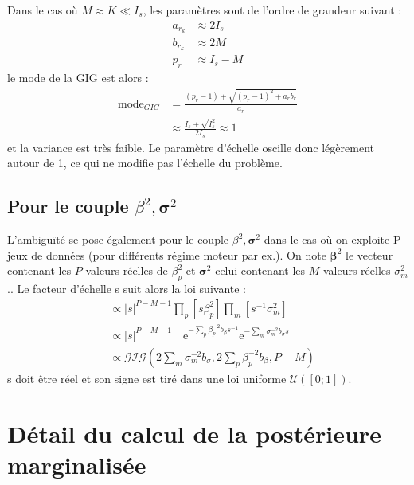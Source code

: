 \documentclass[ 12pt]{article}
\renewcommand\thesection{\Roman{section}} %
\newcommand{\e}{\mathrm{e}}
\begin{document}
Dans le cas où $M\approx K \ll I_s$, les paramètres sont de l'ordre de grandeur suivant :
\begin{align*}
	a_{r_k} &\approx 2 I_s\\
	b_{r_k} &\approx 2M\\
	p_r &\approx  I_s-M
\end{align*}
le mode de la GIG est alors :
\begin{align*}
	\mathrm{mode}_{GIG} & = \frac{(p_r -1) + \sqrt{(p_r-1)^2 + a_rb_r}}{a_r}\\
	& \approx \frac{I_s + \sqrt{I_s^2}}{2I_s} \approx 1
\end{align*}
et la variance est très faible.
Le paramètre d'échelle oscille donc légèrement autour de 1, ce qui ne modifie pas l'échelle du problème.\\


\subsection[]{Pour le couple $\beta^2, \bm{\sigma}^2$}
L’ambiguïté se pose également pour le couple $\beta^2, \bm{\sigma}^2$ dans le cas où on exploite P jeux de données (pour différents régime moteur par ex.).
On note $\bm{\beta}^2$ le vecteur contenant les $P$ valeurs réelles de $\beta^2_p$ et $\bm{\sigma}^2$ celui contenant les $M$ valeurs réelles $\sigma_m^2$.. Le facteur d'échelle s suit alors la loi suivante : 
\begin{align*}
	[s |\infty] &\propto |s|^{P-M-1} \prod_p [s \beta_p^2] \prod_m [s^{-1}\sigma_m^2]\\
	& \propto |s|^{P-M-1} \quad\e^{-\sum_p \beta_p^{-2} b_\beta s^{-1}} \e^{- \sum_m \sigma_m^{-2} b_\sigma s}\\
	& \propto \mathcal{GIG}(2 \sum_m \sigma^{-2}_m b_\sigma, 2 \sum_p \beta^{-2}_p b_\beta, P-M)
\end{align*}
s doit être réel et son signe est tiré dans une loi uniforme $\mathcal{U}([0;1])$.



\newpage
\appendix
\titleformat{\section}[block]{\bfseries\centering}{Annexe \thesection.}{1em}{}
\section{Détail du calcul de la postérieure marginalisée \label{demo_marg}}
\end{document}
